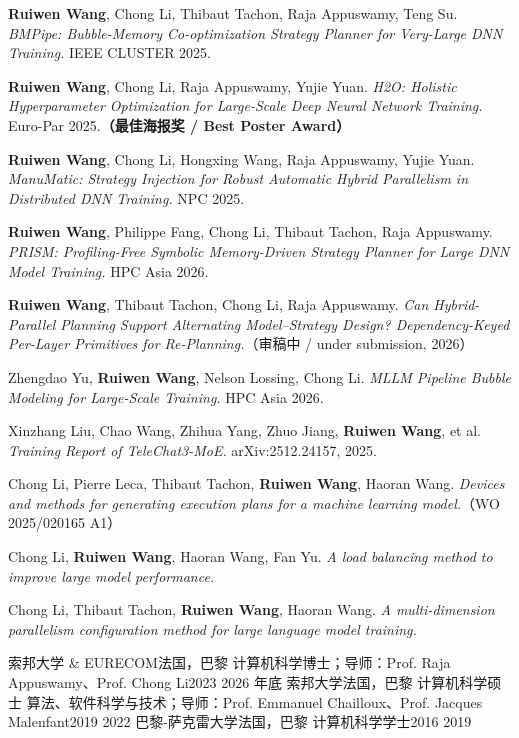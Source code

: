 \documentclass[a4paper,11pt]{article}
\begin{document}
\small
\pubListStart
  \item \textbf{Ruiwen Wang}, Chong Li, Thibaut Tachon, Raja Appuswamy, Teng Su. \textit{BMPipe: Bubble-Memory Co-optimization Strategy Planner for Very-Large DNN Training.} IEEE CLUSTER 2025.
  \item \textbf{Ruiwen Wang}, Chong Li, Raja Appuswamy, Yujie Yuan. \textit{H2O: Holistic Hyperparameter Optimization for Large-Scale Deep Neural Network Training.} Euro-Par 2025.\;\textbf{（最佳海报奖 / Best Poster Award）}
  \item \textbf{Ruiwen Wang}, Chong Li, Hongxing Wang, Raja Appuswamy, Yujie Yuan. \textit{ManuMatic: Strategy Injection for Robust Automatic Hybrid Parallelism in Distributed DNN Training.} NPC 2025.
  \item \textbf{Ruiwen Wang}, Philippe Fang, Chong Li, Thibaut Tachon, Raja Appuswamy. \textit{PRISM: Profiling-Free Symbolic Memory-Driven Strategy Planner for Large DNN Model Training.} HPC Asia 2026.
  \item \textbf{Ruiwen Wang}, Thibaut Tachon, Chong Li, Raja Appuswamy. \textit{Can Hybrid-Parallel Planning Support Alternating Model--Strategy Design? Dependency-Keyed Per-Layer Primitives for Re-Planning.}\;（审稿中 / under submission, 2026）
  \item Zhengdao Yu, \textbf{Ruiwen Wang}, Nelson Lossing, Chong Li. \textit{MLLM Pipeline Bubble Modeling for Large-Scale Training.} HPC Asia 2026.
  \item Xinzhang Liu, Chao Wang, Zhihua Yang, Zhuo Jiang, \textbf{Ruiwen Wang}, et al. \textit{Training Report of TeleChat3-MoE.} arXiv:2512.24157, 2025.
\pubListEnd

\small
\pubListStart
  \item Chong Li, Pierre Leca, Thibaut Tachon, \textbf{Ruiwen Wang}, Haoran Wang. \textit{Devices and methods for generating execution plans for a machine learning model.}（WO 2025/020165 A1）
  \item Chong Li, \textbf{Ruiwen Wang}, Haoran Wang, Fan Yu. \textit{A load balancing method to improve large model performance.}
  \item Chong Li, Thibaut Tachon, \textbf{Ruiwen Wang}, Haoran Wang. \textit{A multi-dimension parallelism configuration method for large language model training.}
\pubListEnd

\cventry
  {索邦大学 \& EURECOM}{法国，巴黎}
  {计算机科学博士；导师：Prof. Raja Appuswamy、Prof. Chong Li}{2023 \textemdash{} 2026 年底}
\itemListStart
\itemListEnd
\cventry
  {索邦大学}{法国，巴黎}
  {计算机科学硕士 \textemdash{} 算法、软件科学与技术；导师：Prof. Emmanuel Chailloux、Prof. Jacques Malenfant}{2019 \textemdash{} 2022}
\cventry
  {巴黎-萨克雷大学}{法国，巴黎}
  {计算机科学学士}{2016 \textemdash{} 2019}
\itemListStart
\itemListEnd
\end{document}
